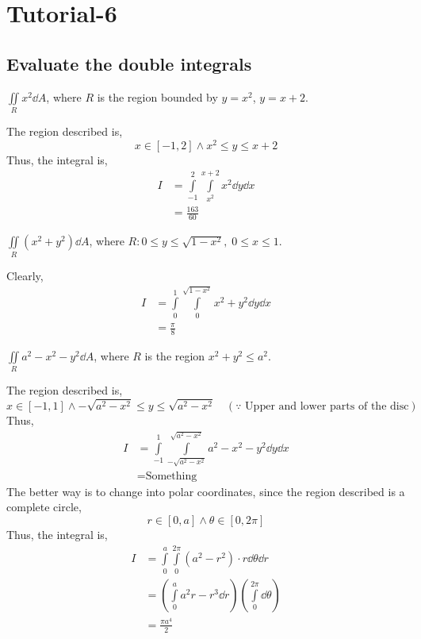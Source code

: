 \section{Tutorial-6}
\subsection{Evaluate the double integrals}
\begin{asign}
	$\iint\limits_Rx^2\dd{A}$, where $R$ is the region bounded by $y=x^2$, $y=x+2$.
\end{asign}
\begin{anse}
	The region described is,
	\[x\in[-1,2] \land x^2\leq y\leq x+2\]
	Thus, the integral is,
	\[\begin{split}
		I&=\int\limits_{-1}^2\int\limits_{x^2}^{x+2}x^2\dd{y}\dd{x}\\
		&=\frac{163}{60}
	\end{split}\]
\end{anse}
\begin{asign}
	$\iint\limits_R (x^2+y^2)\dd{A}$, where $R:0\leq y\leq \sqrt{1-x^2}, \; 0\leq x\leq 1$.
\end{asign}
\begin{anse}
	Clearly,
	\[\begin{split}
		I&=\int\limits_0^1\int\limits_{0}^{\sqrt{1-x^2}}x^2+y^2\dd{y}\dd{x}\\
		&=\frac{\pi}{8}
	\end{split}\]
\end{anse}
\begin{asign}
	$\iint\limits_R a^2-x^2-y^2\dd{A}$, where $R$ is the region $x^2+y^2\leq a^2$.
\end{asign}
\begin{anse}
	The region described is,
	\[x\in[-1,1] \land -\sqrt{a^2-x^2}\leq y\leq \sqrt{a^2-x^2} \quad(\because \text{ Upper and lower parts of the disc})\]
	Thus,
	\[\begin{split}
		I&=\int\limits_{-1}^1\int\limits_{-\sqrt{a^2-x^2}}^{\sqrt{a^2-x^2}}a^2-x^2-y^2\dd{y}\dd{x}\\
		&=\text{Something}
	\end{split}\]
	The better way is to change into polar coordinates, since the region described is a complete circle,
	\[r\in[0,a] \land \theta\in[0,2\pi]\]
	Thus, the integral is,
	\[\begin{split}
		I&=\int\limits_0^a\int\limits_0^{2\pi}(a^2-r^2)\cdot r\dd{\theta}\dd{r}\\
		&=\left(\int\limits_0^aa^2r-r^3\dd{r}\right)\left(\int\limits_0^{2\pi}\dd{\theta}\right)\\
		&=\frac{\pi a^4}{2}
	\end{split}\]
\end{anse}
